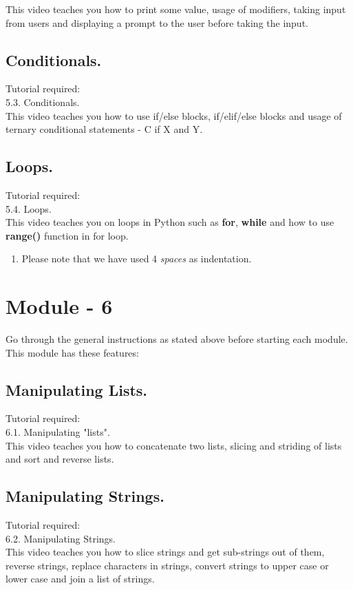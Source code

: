 \documentclass[11pt,twocolumn]{article}
\newenvironment{enumcpt}{\begin{enumerate} \topsep 0pt \partopsep 0pt 
                        \parsep 0pt
                        \itemsep 0pt \leftmargin -1in \rightmargin 0pt
                        }{\end{enumerate}}
\begin{document}
This video teaches you how to print some value, usage of modifiers, taking input from users and displaying a prompt to the user before taking the input. 
\subsection{Conditionals.}
Tutorial required: \\ 5.3. Conditionals. \\
This video teaches you how to use if/else blocks, if/elif/else blocks and usage of ternary conditional statements - C if X and Y.
\subsection{Loops.}
Tutorial required: \\ 5.4. Loops. \\

This video teaches you on loops in Python such as \textbf{for}, \textbf{while} and how to use \textbf{range()} function in for loop. \\ 
\begin{enumcpt}
\item Please note that we have used 4 \emph{spaces} as indentation.
\end{enumcpt} 

\section{Module - 6}
Go through the general instructions as stated above before starting each module.
This module has these features:
\subsection{Manipulating Lists.}
Tutorial required: \\ 6.1. Manipulating "lists". \\
 
This video teaches you how to concatenate two lists, slicing and striding of lists and sort and reverse lists.
\subsection{Manipulating Strings.}
Tutorial required: \\ 6.2. Manipulating Strings. \\

This video teaches you how to slice strings and get sub-strings out of them, reverse strings, replace characters in strings, convert strings to upper case or lower case and join  a list of strings. 
\end{document}
